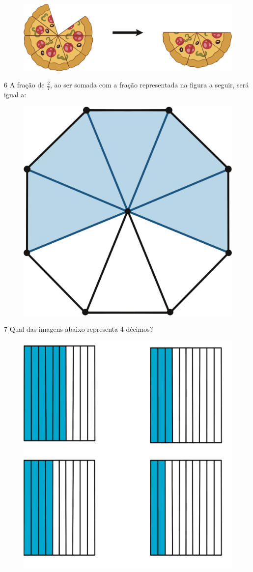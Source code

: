 \begin{figure}[htpb!]
\centering
\includegraphics[width=\textwidth]{./ilustras-mat/modulo_3-atividade_5.png}
\end{figure}


\pagebreak
\num{6} A fração de $\frac{2}{7}$, ao ser somada com a fração
representada na figura a seguir, será igual a:

\begin{figure}[htpb!]
\centering
\includegraphics[width=.5\textwidth]{./ilustras-mat/modulo_3-atividade_6.png}
\end{figure}

\begin{emptybox}
\end{emptybox}

\num{7} Qual das imagens abaixo representa 4 décimos?

\begin{figure}[htpb!]
\centering
\includegraphics[width=.5\textwidth]{./ilustras-mat/modulo_3-atividade_7.png}
\end{figure}

